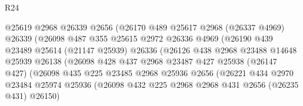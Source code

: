 \begin{lexlean}{R24}
\begin{coremodule}
                            @25619
                            @2968
                            @26339
                            @2656
                            (@26170
                              @489
                              @25617
                              @2968
                              (@26337 @4969)
                              @26339
                              (@26098
                                @487
                                @355
                                @25615
                                @2972
                                @26336
                                @4969
                                (@26190
                                  @439
                                  @23489
                                  @25614
                                  (@21147 @25939)
                                  @26336
                                  (@26126
                                    @438
                                    @2968
                                    @23488
                                    @14648
                                    @25939
                                    @26138
                                    (@26098
                                      @428
                                      @437
                                      @2968
                                      @23487
                                      @427
                                      @25938
                                      (@26147 @427)
                                      (@26098
                                        @435
                                        @225
                                        @23485
                                        @2968
                                        @25936
                                        @2656
                                        (@26221
                                          @434
                                          @2970
                                          @23484
                                          @25974
                                          @25936
                                          (@26098
                                            @432
                                            @225
                                            @2968
                                            @2968
                                            @431
                                            @2656
                                            (@26235 @431)
                                            @26150)

\end{coremodule}
\end{lexlean}
